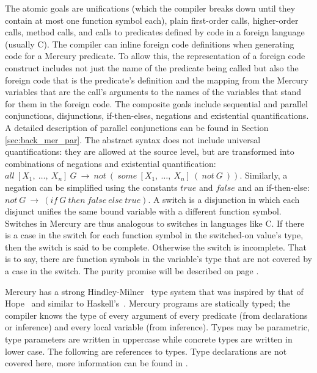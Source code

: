 \noindent
The atomic goals are unifications
(which the compiler breaks down until they contain
at most one function symbol each),
plain first-order calls,
higher-order calls,
method calls,
and calls to predicates defined by code in a foreign language (usually C).
The compiler can inline foreign code definitions when generating code
for a Mercury predicate.
To allow this, the representation of a foreign code construct includes
not just the name of the predicate being called
but also the foreign code that is the predicate's definition
and the mapping from the Mercury variables that are the call's arguments
to the names of the variables that stand for them in the foreign code.
The composite goals include
sequential and parallel conjunctions,
disjunctions, if-then-elses, negations and existential quantifications.
A detailed description of parallel conjunctions can be found in Section
\ref{sec:back_mer_par}.
The abstract syntax does not include universal quantifications:
they are allowed at the source level,
but are transformed into combinations of negations and existential quantification:
$all~[X_1,~\ldots,~X_n]~G~\rightarrow~not~(~some~[X_1,~\ldots,~X_n]~(~not~G~))$.
Similarly,
a negation can be simplified using the constants $true$ and $false$ and an
if-then-else:
$not~G~\rightarrow~(if~G~then~false~else~true)$.
A switch is a disjunction in which
each disjunct unifies the same bound variable
with a different function symbol.
Switches in Mercury are thus analogous to switches in languages like C.
If there is a case in the switch for each function symbol in the
switched-on value's type, then the switch is said to be complete.
Otherwise the switch is incomplete.
That is to say,
there are function symbols in the variable's type that are not covered
by a case in the switch.
The purity promise will be described on page \pageref{page:purity}.


Mercury has a strong Hindley-Milner~\citep{hindley69:types,milner78:types} type
system that was inspired by that of Hope~\citep{hope_types}
and similar to Haskell's~\citep{haskell98}.
Mercury programs are statically typed; the compiler knows the type of every
argument of every predicate (from declarations or inference) and every local
variable (from inference).
Types may be parametric,
type parameters are written in uppercase while
concrete types are written in lower case.
The following are references to types.
Type declarations are not covered here,
more information can be found in \citet{mercury_refman}.

